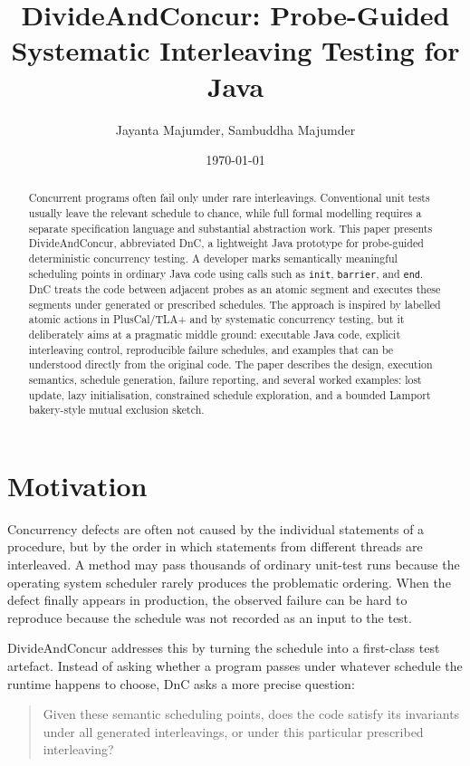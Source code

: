 \documentclass[11pt]{article}
\title{DivideAndConcur: Probe-Guided Systematic Interleaving Testing for Java}
\author{Jayanta Majumder, Sambuddha Majumder}
\date{\today}
\begin{document}
\maketitle

\begin{abstract}
Concurrent programs often fail only under rare interleavings. Conventional unit tests usually leave the relevant schedule to chance, while full formal modelling requires a separate specification language and substantial abstraction work. This paper presents DivideAndConcur, abbreviated DnC, a lightweight Java prototype for probe-guided deterministic concurrency testing. A developer marks semantically meaningful scheduling points in ordinary Java code using calls such as \texttt{init}, \texttt{barrier}, and \texttt{end}. DnC treats the code between adjacent probes as an atomic segment and executes these segments under generated or prescribed schedules. The approach is inspired by labelled atomic actions in PlusCal/TLA+ and by systematic concurrency testing, but it deliberately aims at a pragmatic middle ground: executable Java code, explicit interleaving control, reproducible failure schedules, and examples that can be understood directly from the original code. The paper describes the design, execution semantics, schedule generation, failure reporting, and several worked examples: lost update, lazy initialisation, constrained schedule exploration, and a bounded Lamport bakery-style mutual exclusion sketch.
\end{abstract}

\section{Motivation}

Concurrency defects are often not caused by the individual statements of a procedure, but by the order in which statements from different threads are interleaved. A method may pass thousands of ordinary unit-test runs because the operating system scheduler rarely produces the problematic ordering. When the defect finally appears in production, the observed failure can be hard to reproduce because the schedule was not recorded as an input to the test.

DivideAndConcur addresses this by turning the schedule into a first-class test artefact. Instead of asking whether a program passes under whatever schedule the runtime happens to choose, DnC asks a more precise question:

\begin{quote}
Given these semantic scheduling points, does the code satisfy its invariants under all generated interleavings, or under this particular prescribed interleaving?
\end{quote}
\end{document}

